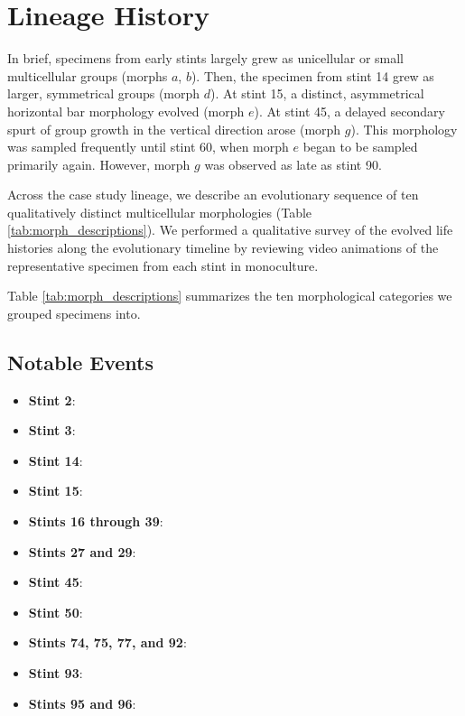 



\section{Lineage History}



In brief, specimens from early stints largely grew as unicellular or small multicellular groups (morphs $a$, $b$).
Then, the specimen from stint 14 grew as larger, symmetrical groups (morph $d$).
At stint 15, a distinct, asymmetrical horizontal bar morphology evolved (morph $e$).
At stint 45, a delayed secondary spurt of group growth in the vertical direction arose (morph $g$).
This morphology was sampled frequently until stint 60, when morph $e$ began to be sampled primarily again.
However, morph $g$ was observed as late as stint 90.


Across the case study lineage, we describe an evolutionary sequence of ten qualitatively distinct multicellular morphologies (Table \ref{tab:morph_descriptions}).
We performed a qualitative survey of the evolved life histories along the evolutionary timeline by reviewing video animations of the representative specimen from each stint in monoculture.




Table \ref{tab:morph_descriptions} summarizes the ten morphological categories we grouped specimens into.


\subsection{Notable Events}

\begin{itemize}
\item \textbf{Stint 2}:
\item \textbf{Stint 3}:
\item \textbf{Stint 14}:
\item \textbf{Stint 15}:
\item \textbf{Stints 16 through 39}:
\item \textbf{Stints 27 and 29}:
\item \textbf{Stint 45}:
\item \textbf{Stint 50}:
\item \textbf{Stints 74, 75, 77, and 92}:
\item \textbf{Stint 93}:
\item \textbf{Stints 95 and 96}:
\end{itemize}

